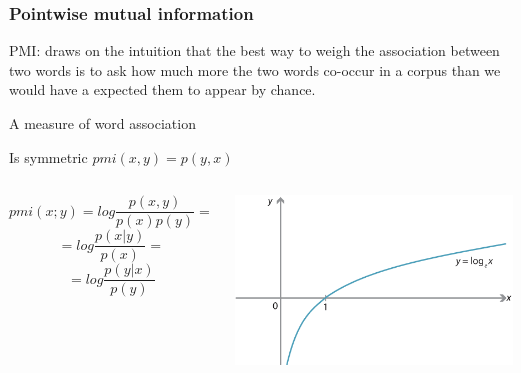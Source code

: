 \documentclass[svgnames]{beamer}
\begin{document}
%
%
%
%
%

\begin{frame}
  \frametitle{Pointwise mutual information}


    PMI: draws on the intuition that the best way to weigh the association between two words is to ask how much more
    the two words co-occur in a corpus than we would have a expected them to appear by chance.

    A measure of word association

    Is symmetric $pmi(x, y) = p(y, x)$
  \begin{columns}

  $$
  pmi(x;y) = log \frac{p(x,y)}{p(x)p(y)} =
  $$
  $$
  = log \frac{p(x|y)}{p(x)} =
  $$
  $$
  = log \frac{p(y|x)}{p(y)}
  $$
    
  \includegraphics[width=\textwidth]{log}
  \end{columns}
\end{frame}
\end{document}
